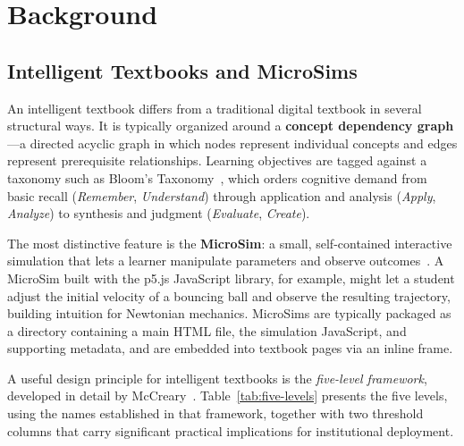 \section{Background}

\subsection{Intelligent Textbooks and MicroSims}

An intelligent textbook differs from a traditional digital textbook in several
structural ways. It is typically organized around a \textbf{concept dependency
graph}---a directed acyclic graph in which nodes represent individual concepts
and edges represent prerequisite relationships. Learning objectives are tagged
against a taxonomy such as Bloom's Taxonomy~\cite{bloom1956taxonomy}, which
orders cognitive demand from basic recall (\textit{Remember},
\textit{Understand}) through application and analysis (\textit{Apply},
\textit{Analyze}) to synthesis and judgment (\textit{Evaluate}, \textit{Create}).

The most distinctive feature is the \textbf{MicroSim}: a small, self-contained
interactive simulation that lets a learner manipulate parameters and observe
outcomes~\cite{lockhart2025microsims}. A MicroSim built with the p5.js
JavaScript library, for example, might let a student adjust the initial
velocity of a bouncing ball and observe the resulting trajectory, building
intuition for Newtonian mechanics. MicroSims are typically packaged as a
directory containing a main HTML file, the simulation JavaScript, and
supporting metadata, and are embedded into textbook pages via an inline frame.

A useful design principle for intelligent textbooks is the
\textit{five-level framework}, developed in detail by
McCreary~\cite{mccreary2025fivelevels}. Table~\ref{tab:five-levels} presents
the five levels, using the names established in that framework, together with
two threshold columns that carry significant practical implications for
institutional deployment.

